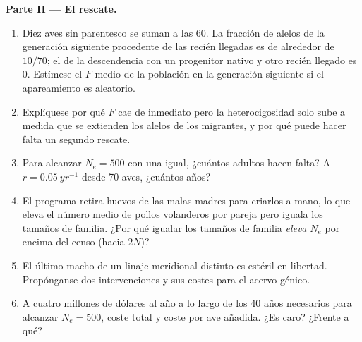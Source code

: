 \begin{problem}
\medskip
\noindent\textbf{Parte II --- El rescate.}
\begin{enumerate}[resume]
  \item Diez aves sin parentesco se suman a las 60. La fracción de
        alelos de la generación siguiente procedente de las recién
        llegadas es de alrededor de $10/70$; el 
        de la descendencia con un progenitor nativo y otro recién
        llegado es $0$. Estímese el $F$ medio de la población en la
        generación siguiente si el apareamiento es aleatorio.
  \item Explíquese por qué $F$ cae de inmediato pero la heterocigosidad
        solo sube a medida que se extienden los alelos de los migrantes,
        y por qué puede hacer falta un segundo rescate.
  \item Para alcanzar $N_{e} = 500$ con una  igual,
        ¿cuántos adultos hacen falta? A $r = \qty{0.05}{yr^{-1}}$ desde
        70 aves, ¿cuántos años?
  \item El programa retira huevos de las malas madres para criarlos a
        mano, lo que eleva el número medio de pollos volanderos por
        pareja pero iguala los tamaños de familia. ¿Por qué igualar los
        tamaños de familia \emph{eleva} $N_{e}$ por encima del censo
        (hacia $2N$)?
  \item El último macho de un linaje meridional distinto es estéril en
        libertad. Propónganse dos intervenciones y sus costes para el
        acervo génico.
  \item A cuatro millones de dólares al año a lo largo de los 40 años
        necesarios para alcanzar $N_{e} = 500$, coste total y coste por
        ave añadida. ¿Es caro? ¿Frente a qué?
\end{enumerate}


\end{problem}
